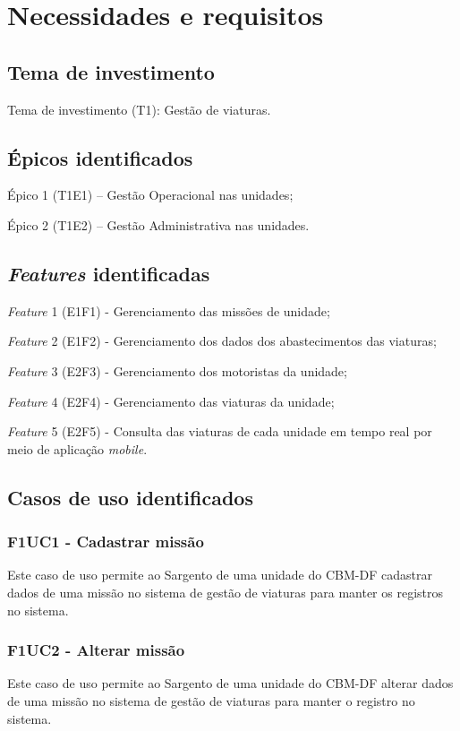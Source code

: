 \chapter{Necessidades e requisitos}
  
  \section{Tema de investimento}
  
  Tema de investimento (T1): Gestão de viaturas.
  
  \section{Épicos identificados}
    
  Épico 1 (T1E1) – Gestão Operacional nas unidades;
  
  Épico 2 (T1E2) – Gestão Administrativa nas unidades.
  
  \section{\textit{Features} identificadas}
  
  \textit{Feature} 1 (E1F1) - Gerenciamento das missões de unidade;
  
  \textit{Feature} 2 (E1F2) - Gerenciamento dos dados dos abastecimentos das viaturas;
  
  \textit{Feature} 3 (E2F3) - Gerenciamento dos motoristas da unidade;
  
  \textit{Feature} 4 (E2F4) - Gerenciamento das viaturas da unidade;
  
  \textit{Feature} 5 (E2F5) - Consulta das viaturas de cada unidade em tempo real por meio de aplicação \textit{mobile}. 
  
  \section{Casos de uso identificados} 

  \subsection{F1UC1 - Cadastrar missão}
Este caso de uso permite ao Sargento de uma unidade do CBM-DF cadastrar dados de uma missão no sistema de gestão de viaturas para manter os registros no sistema.
  \subsection{F1UC2 - Alterar missão}
Este caso de uso permite ao Sargento de uma unidade do CBM-DF alterar dados de uma missão no sistema de gestão de viaturas para manter o registro no sistema.
